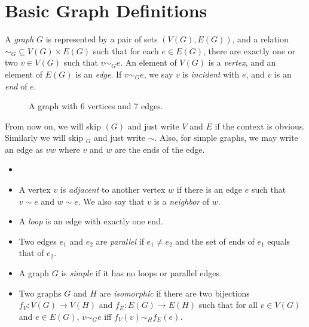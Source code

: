 

    \section{Basic Graph Definitions}
        
        \begin{defn}[Graph] \label{def_graph}
            A \emph{graph} $G$ is represented by a pair of sets $(V(G), E(G))$, and a relation $\sim _G \subseteq V(G) \times E(G)$ such that for each $e \in E(G)$, there are exactly one or two $v \in V(G)$ such that $v \sim _G e$. An element of $V(G)$ is a \emph{vertex}, and an element of $E(G)$ is an \emph{edge}. If $v \sim _G e$, we say $v$ is \emph{incident} with $e$, and $v$ is an \emph{end} of $e$.
        \end{defn}
        
        \begin{figure}[h] \centering {}
        \caption{A graph with 6 vertices and 7 edges.} \label{fig-graph_example}
        \end{figure}
        
        From now on, we will skip $(G)$ and just write $V$ and $E$ if the context is obvious. Similarly we will skip $_G$ and just write $\sim$. Also, for simple graphs, we may write an edge as $vw$ where $v$ and $w$ are the ends of the edge.
        
        \begin{defn} \label{def_graph_terms} \begin{itemize}
            \item[]
            \item A vertex $v$ is \emph{adjacent} to another vertex $w$ if there is an edge $e$ such that $v \sim e$ and $w \sim e$. We also say that $v$ is a \emph{neighbor} of $w$.
            \item A \emph{loop} is an edge with exactly one end.
            \item Two edges $e_1$ and $e_2$ are \emph{parallel} if $e_1 \neq e_2$ and the set of ends of $e_1$ equals that of $e_2$.
            \item A graph $G$ is \emph{simple} if it has no loops or parallel edges.
            \item Two graphs $G$ and $H$ are \emph{isomorphic} if there are two bijections $f_V : V(G) \to V(H)$ and $f_E : E(G) \to E(H)$ such that for all $v \in V(G)$ and $e \in E(G)$, $v \sim_G e$ iff $f_V(v) \sim_H f_E(e)$.
        \end{itemize} \end{defn}
        
